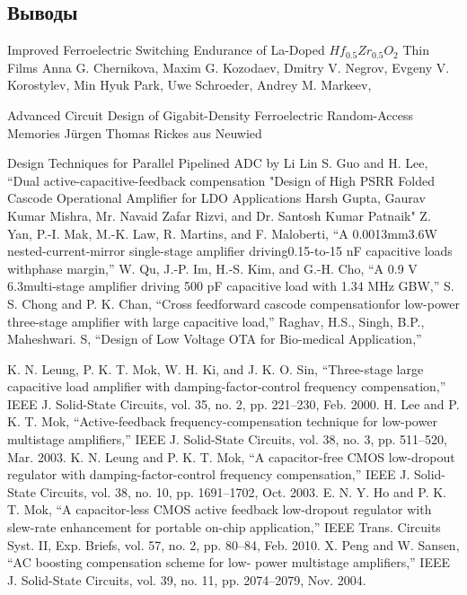 \documentclass[a4paper,12pt]{article} %
\begin{document}
\subsection{Выводы}




\begin{thebibliography}{}
  Improved Ferroelectric Switching Endurance of La-Doped $Hf_{0.5}Zr_{0.5}O_2$
Thin Films
Anna G. Chernikova, Maxim G. Kozodaev, Dmitry V. Negrov, Evgeny V. Korostylev,
Min Hyuk Park, Uwe Schroeder, Andrey M. Markeev,

 Advanced Circuit Design of
Gigabit-Density Ferroelectric
Random-Access Memories Jürgen Thomas Rickes aus Neuwied  


 Design Techniques for Parallel Pipelined ADC  by Li Lin
	S. Guo and H. Lee, “Dual active-capacitive-feedback compensation	
	"Design of High PSRR Folded Cascode Operational Amplifier for LDO Applications
Harsh Gupta, Gaurav Kumar Mishra, Mr. Navaid Zafar Rizvi, and Dr. Santosh Kumar Patnaik"	
 	Z. Yan, P.-I. Mak, M.-K. Law, R. Martins, and F. Maloberti, “A 0.0013mm3.6W nested-current-mirror single-stage amplifier driving0.15-to-15 nF capacitive loads withphase margin,”
	W. Qu, J.-P. Im, H.-S. Kim, and G.-H. Cho, “A 0.9 V 6.3multi-stage amplifier driving 500 pF capacitive load with 1.34 MHz GBW,”	
	S. S. Chong and P. K. Chan, “Cross feedforward cascode compensationfor low-power three-stage amplifier with large capacitive load,”	
	Raghav,  H.S.,  Singh,  B.P.,  Maheshwari.  S,  “Design  of  Low  Voltage  OTA  for  Bio-medical  Application,” 	


 K. N. Leung, P. K. T. Mok, W. H. Ki, and J. K. O. Sin, “Three-stage
large capacitive load amplifier with damping-factor-control frequency
compensation,” IEEE J. Solid-State Circuits, vol. 35, no. 2, pp.
221–230, Feb. 2000.
 H. Lee and P. K. T. Mok, “Active-feedback frequency-compensation
technique for low-power multistage amplifiers,” IEEE J. Solid-State
Circuits, vol. 38, no. 3, pp. 511–520, Mar. 2003.
 K. N. Leung and P. K. T. Mok, “A capacitor-free CMOS low-dropout
regulator with damping-factor-control frequency compensation,” IEEE
J. Solid-State Circuits, vol. 38, no. 10, pp. 1691–1702, Oct. 2003.
 E. N. Y. Ho and P. K. T. Mok, “A capacitor-less CMOS active feedback
low-dropout regulator with slew-rate enhancement for portable on-chip
application,” IEEE Trans. Circuits Syst. II, Exp. Briefs, vol. 57, no. 2,
pp. 80–84, Feb. 2010.
 X. Peng and W. Sansen, “AC boosting compensation scheme for low-
power multistage amplifiers,” IEEE J. Solid-State Circuits, vol. 39, no.
11, pp. 2074–2079, Nov. 2004.


\end{thebibliography}
\end{document}
